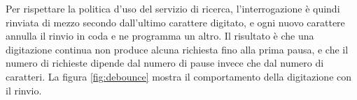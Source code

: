 
Per rispettare la politica d'uso del servizio di ricerca, l'interrogazione è quindi rinviata di mezzo secondo dall'ultimo
carattere digitato, e ogni nuovo carattere annulla il rinvio in coda e ne programma un altro.
Il risultato è che una digitazione continua non produce alcuna richiesta fino alla prima pausa, e che il numero di richieste
dipende dal numero di pause invece che dal numero di caratteri.
La figura \ref{fig:debounce} mostra il comportamento della digitazione con il rinvio.%

